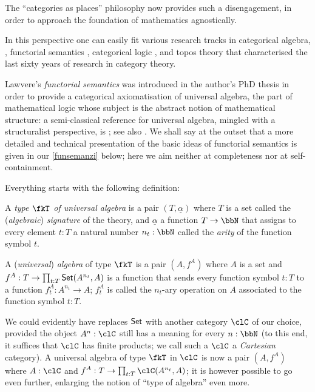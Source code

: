 The ``categories as places'' philosophy now provides such a disengagement, in order to approach the foundation of mathematics agnostically.%

In this perspective one can easily fit various research tracks in categorical algebra, \cite{Janelidze2004}, functorial semantics \cite{lawvere1963functorial,hyland2007category}, categorical logic \cite{lambek1988introduction}, and topos theory \cite{JohnstonePT} that characterised the last sixty years of research in category theory.

Lawvere's \emph{functorial semantics} was introduced in the author's PhD thesis \cite{lawvere1963functorial} in order to provide a categorical axiomatisation of universal algebra, the part of mathematical logic whose subject is the abstract notion of mathematical structure: a semi-classical reference for universal algebra, mingled with a structuralist perspective, is \cite{manes2012algebraic}; see also \cite{sankappanavar}. We shall say at the outset that a more detailed and technical presentation of the basic ideas of functorial semantics is given in our \autoref{funsemanzi} below; here we aim neither at completeness nor at self-containment.

Everything starts with the following definition:
\begin{definition}\label{unialg}
	A \emph{type $\fkT$ of universal algebra} is a pair $(T,\underline{\alpha})$ where $T$ is a set called the (\emph{algebraic}) \emph{signature} of the theory, and $\underline\alpha$ a function $T \to \bbN$ that assigns to every element $t: T$ a natural number $n_t: \bbN$ called the \emph{arity} of the function symbol $t$.
\end{definition}
\begin{definition}
	A (\emph{universal}) \emph{algebra} of type $\fkT$ is a pair $(A,f^A)$ where $A$ is a set and $f^A: T \to \prod_{t: T} \mathsf{Set}(A^{n_t},A )$ is a function that sends every function symbol $t: T$ to a function $f^A_t: A^{n_t} \to A$; $f^A_t$ is called the $n_t$-ary operation on $A$ associated to the function symbol $t: T$.
\end{definition}
We could evidently have replaces $\mathsf{Set}$ with another category $\clC$ of our choice, provided the object $A^n: \clC$ still has a meaning for every $n: \bbN$ (to this end, it suffices that $\clC$ has finite products; we call such a $\clC$ a \emph{Cartesian} category). A universal algebra of type $\fkT$ in $\clC$ is now a pair $(A,f^A)$ where $A: \clC$ and $f^A: T \to \prod_{t: T} \clC(A^{n_t},A )$; it is however possible to go even further, enlarging the notion of ``type of algebra'' even more.

